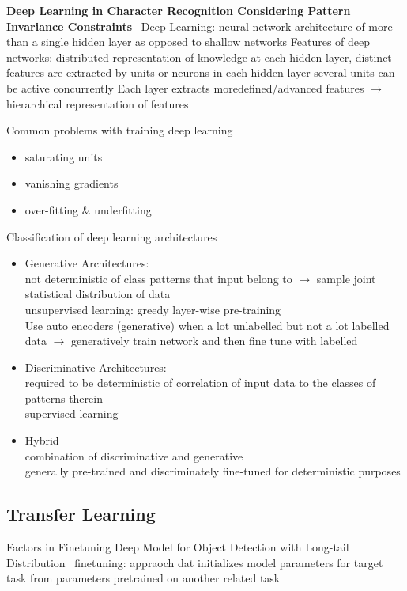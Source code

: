 \textbf{Deep Learning in Character Recognition Considering Pattern Invariance
Constraints}~\cite{oyedotun_deep_2015}
Deep Learning: neural network architecture of more than a single hidden layer as opposed to shallow networks
Features of deep networks: distributed representation of knowledge at each hidden layer, distinct
features are extracted by units or neurons in each hidden layer
several units can be active concurrently
Each layer extracts moredefined/advanced features $\rightarrow$ hierarchical representation of
features

Common problems with training deep learning
\begin{itemize}
    \item saturating units
    \item vanishing gradients
    \item over-fitting \& underfitting
\end{itemize}

Classification of deep learning architectures
\begin{itemize}
    \item Generative Architectures:\\
        not deterministic of class patterns that input belong to $\rightarrow$ sample joint
        statistical distribution of data\\
        unsupervised learning: greedy layer-wise pre-training\\
        Use auto encoders (generative) when a lot unlabelled but not a lot labelled data
        $\rightarrow$ generatively train network and then fine tune with labelled
    \item Discriminative Architectures:\\
        required to be deterministic of correlation of input data to the classes of patterns therein\\
        supervised learning
    \item Hybrid\\
        combination of discriminative and generative\\
        generally pre-trained and discriminately fine-tuned for deterministic purposes
\end{itemize}

\subsection*{Transfer Learning}
Factors in Finetuning Deep Model for Object Detection with Long-tail
Distribution~\cite{ouyang_factors_2016}
finetuning: appraoch dat initializes model parameters for target task from parameters pretrained on
another related task

